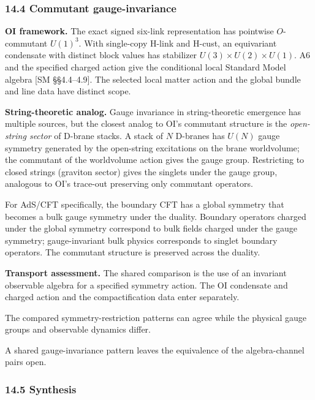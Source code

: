 \documentclass[
]{article}
\begin{document}
\hypertarget{commutant-gauge-invariance}{%
\subsubsection{14.4 Commutant
gauge-invariance}\label{commutant-gauge-invariance}}

\textbf{OI framework.} The exact signed six-link representation has
pointwise \(O\)-commutant \(U(1)^3\). With single-copy H-link and
H-cust, an equivariant condensate with distinct block values has
stabilizer \(U(3)\times U(2)\times U(1)\). A6 and the specified charged
action give the conditional local Standard Model algebra {[}SM
§§4.4--4.9{]}. The selected local matter action and the global bundle
and line data have distinct scope.

\textbf{String-theoretic analog.} Gauge invariance in string-theoretic
emergence has multiple sources, but the closest analog to OI's commutant
structure is the \emph{open-string sector} of D-brane stacks. A stack of
\(N\) D-branes has \(U(N)\) gauge symmetry generated by the open-string
excitations on the brane worldvolume; the commutant of the worldvolume
action gives the gauge group. Restricting to closed strings (graviton
sector) gives the singlets under the gauge group, analogous to OI's
trace-out preserving only commutant operators.

For AdS/CFT specifically, the boundary CFT has a global symmetry that
becomes a bulk gauge symmetry under the duality. Boundary operators
charged under the global symmetry correspond to bulk fields charged
under the gauge symmetry; gauge-invariant bulk physics corresponds to
singlet boundary operators. The commutant structure is preserved across
the duality.

\textbf{Transport assessment.} The shared comparison is the use of an
invariant observable algebra for a specified symmetry action. The OI
condensate and charged action and the compactification data enter
separately.

The compared symmetry-restriction patterns can agree while the physical
gauge groups and observable dynamics differ.

A shared gauge-invariance pattern leaves the equivalence of the
algebra-channel pairs open.

\hypertarget{synthesis}{%
\subsubsection{14.5 Synthesis}\label{synthesis}}
\end{document}
